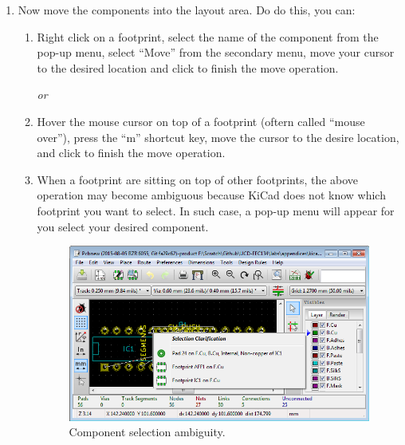 \documentclass[12pt,letterpaper]{scrartcl}
\begin{document}
\begin{enumerate}
	\item Now move the components into the layout area. Do do this, you can:
		\begin{enumerate}
			\item Right click on a footprint, select the name of the component from the pop-up menu, select ``Move'' from the secondary menu, move your cursor to the desired location and click to finish the move operation. 
			
			\textit{or} 
			
			\item Hover the mouse cursor on top of a footprint (oftern called ``mouse over''), press the ``m'' shortcut key, move the cursor to the desire location, and click to finish the move operation. 
			
			\item When a footprint are sitting on top of other footprints, the above operation may become ambiguous because KiCad does not know which footprint you want to select. In such case, a pop-up menu will appear for you select your desired component. 
				\begin{figure}[h]
					\centering
					\includegraphics[width=4in]{ambiguity}
					\caption{Component selection ambiguity.}
					\label{fig:ambiguity}
				\end{figure}
			

\end{enumerate}
\end{enumerate}
\end{document}
